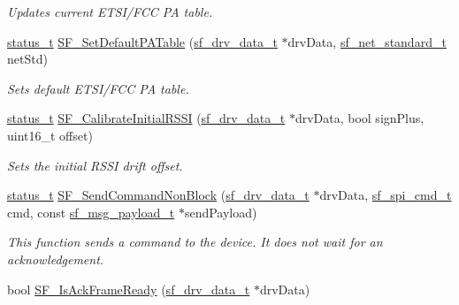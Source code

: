 \begin{DoxyCompactItemize}
\begin{DoxyCompactList}\small\item\em Updates current E\+T\+S\+I/\+F\+CC PA table. \end{DoxyCompactList}\item 
\mbox{\hyperlink{group__ksdk__common_gaaabdaf7ee58ca7269bd4bf24efcde092}{status\+\_\+t}} \mbox{\hyperlink{group__sf__functions__group_gad44ab2d70a7132b381104107168ba771}{S\+F\+\_\+\+Set\+Default\+P\+A\+Table}} (\mbox{\hyperlink{structsf__drv__data__t}{sf\+\_\+drv\+\_\+data\+\_\+t}} $\ast$drv\+Data, \mbox{\hyperlink{group__sf__enum__group_ga9ad07e4b666d7d70f7a69614ecb89421}{sf\+\_\+net\+\_\+standard\+\_\+t}} net\+Std)
\begin{DoxyCompactList}\small\item\em Sets default E\+T\+S\+I/\+F\+CC PA table. \end{DoxyCompactList}\item 
\mbox{\hyperlink{group__ksdk__common_gaaabdaf7ee58ca7269bd4bf24efcde092}{status\+\_\+t}} \mbox{\hyperlink{group__sf__functions__group_gad4d10186e176ecb487ff78e3d5a5cd75}{S\+F\+\_\+\+Calibrate\+Initial\+R\+S\+SI}} (\mbox{\hyperlink{structsf__drv__data__t}{sf\+\_\+drv\+\_\+data\+\_\+t}} $\ast$drv\+Data, bool sign\+Plus, uint16\+\_\+t offset)
\begin{DoxyCompactList}\small\item\em Sets the initial R\+S\+SI drift offset. \end{DoxyCompactList}\item 
\mbox{\hyperlink{group__ksdk__common_gaaabdaf7ee58ca7269bd4bf24efcde092}{status\+\_\+t}} \mbox{\hyperlink{group__sf__functions__group_ga9d5eef189c6bc644ca5a1ded155d700b}{S\+F\+\_\+\+Send\+Command\+Non\+Block}} (\mbox{\hyperlink{structsf__drv__data__t}{sf\+\_\+drv\+\_\+data\+\_\+t}} $\ast$drv\+Data, \mbox{\hyperlink{group__sf__enum__group_ga06921e348326a2db772246fef63b2545}{sf\+\_\+spi\+\_\+cmd\+\_\+t}} cmd, const \mbox{\hyperlink{structsf__msg__payload__t}{sf\+\_\+msg\+\_\+payload\+\_\+t}} $\ast$send\+Payload)
\begin{DoxyCompactList}\small\item\em This function sends a command to the device. It does not wait for an acknowledgement. \end{DoxyCompactList}\item 
bool \mbox{\hyperlink{group__sf__functions__group_ga1aa190c9d68ca42596579425130183b2}{S\+F\+\_\+\+Is\+Ack\+Frame\+Ready}} (\mbox{\hyperlink{structsf__drv__data__t}{sf\+\_\+drv\+\_\+data\+\_\+t}} $\ast$drv\+Data)

\end{DoxyCompactItemize}
